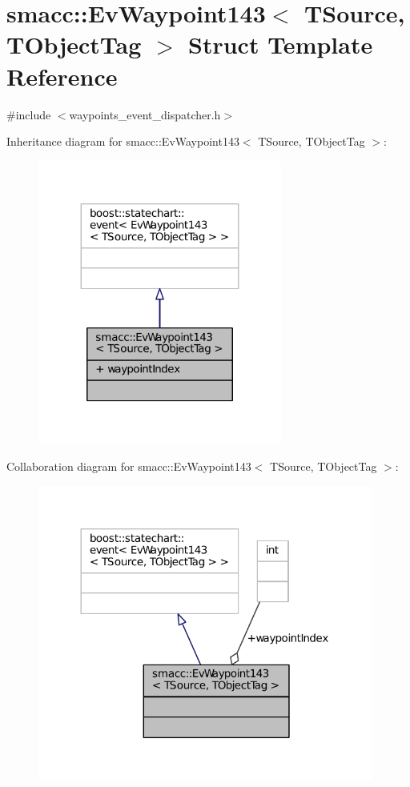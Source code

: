 \hypertarget{structsmacc_1_1EvWaypoint143}{}\section{smacc\+:\+:Ev\+Waypoint143$<$ T\+Source, T\+Object\+Tag $>$ Struct Template Reference}
\label{structsmacc_1_1EvWaypoint143}


{\ttfamily \#include $<$waypoints\+\_\+event\+\_\+dispatcher.\+h$>$}



Inheritance diagram for smacc\+:\+:Ev\+Waypoint143$<$ T\+Source, T\+Object\+Tag $>$\+:
\nopagebreak
\begin{figure}[H]
\begin{center}
\leavevmode
\includegraphics[width=227pt]{structsmacc_1_1EvWaypoint143__inherit__graph}
\end{center}
\end{figure}


Collaboration diagram for smacc\+:\+:Ev\+Waypoint143$<$ T\+Source, T\+Object\+Tag $>$\+:
\nopagebreak
\begin{figure}[H]
\begin{center}
\leavevmode
\includegraphics[width=312pt]{structsmacc_1_1EvWaypoint143__coll__graph}
\end{center}
\end{figure}
